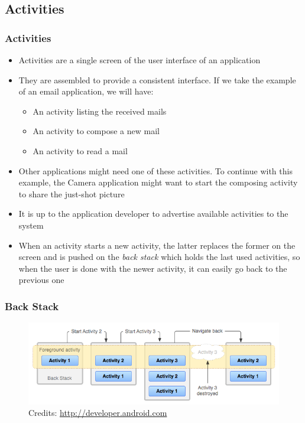 \subsection{Activities}
\begin{frame}
  \frametitle{Activities}
  \begin{itemize}
  \item Activities are a single screen of the user interface of an
    application
  \item They are assembled to provide a consistent interface. If we
    take the example of an email application, we will have:
    \begin{itemize}
    \item An activity listing the received mails
    \item An activity to compose a new mail
    \item An activity to read a mail
    \end{itemize}
  \item Other applications might need one of these activities. To
    continue with this example, the Camera application might want to
    start the composing activity to share the just-shot picture
  \item It is up to the application developer to advertise available
    activities to the system
  \item When an activity starts a new activity, the latter replaces
    the former on the screen and is pushed on the \emph{back stack}
    which holds the last used activities, so when the user is done
    with the newer activity, it can easily go back to the previous one
  \end{itemize}
\end{frame}

\begin{frame}
  \frametitle{Back Stack}
  \begin{figure}[h!]
    \centering
    \includegraphics[width=\textwidth]{slides/android-application-activities/activity-backstack.png}\\
    {
      \tiny
      Credits: \url{http://developer.android.com}
    }
  \end{figure}
\end{frame}

